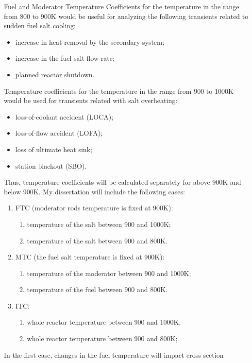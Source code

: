 Fuel and Moderator Temperature Coefficients for the temperature in the range 
from 800 to 900K would be useful for analyzing the following transients 
related to sudden fuel salt cooling: 
\begin{itemize}
	\item increase in heat removal by the secondary system;
	\item increase in the fuel salt flow rate;
	\item planned reactor shutdown.
\end{itemize}
Temperature coefficients for the temperature in the range from 900 to 1000K 
would be used for transients related with salt overheating: 
\begin{itemize}
	\item loss-of-coolant accident (LOCA);
	\item loss-of-flow accident (LOFA);
	\item loss of ultimate heat sink;
	\item  station blackout (SBO).
\end{itemize}
Thus, temperature coefficients will be calculated separately for above 900K 
and below 900K. My dissertation will include the following cases: 
\begin{enumerate}
	\item FTC (moderator rods temperature is fixed at 900K):
		\begin{enumerate}[label=(\alph*)]
			\item temperature of the salt between 900 and 1000K;
			\item temperature of the salt between 900 and 800K.
		\end{enumerate}
	\item MTC (the fuel salt temperature is fixed at 900K): 
		\begin{enumerate}[label=(\alph*)]
			\item temperature of the moderator between 900 and 1000K;
			\item temperature of the fuel between 900 and 800K.
		\end{enumerate}
	\item ITC: 
		\begin{enumerate}[label=(\alph*)]
			\item whole reactor temperature between 900 and 1000K;
			\item whole reactor temperature between 900 and 800K;
		\end{enumerate}
\end{enumerate}
In the first case, changes in the fuel temperature will impact cross section 
